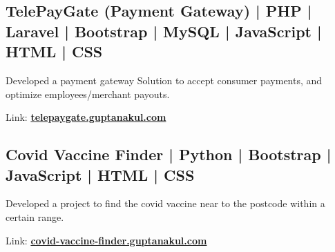 \documentclass[]{deedy-resume-openfont}
\begin{document}
\begin{minipage}[t]{0.55\textwidth}
\subsection{TelePayGate (Payment Gateway) | PHP | Laravel | Bootstrap | MySQL | JavaScript | HTML | CSS}
\sectionsep
\vspace{\topsep}
\begin{tightemize}
\item Developed a payment gateway Solution to accept consumer payments, and optimize employees/merchant payouts.
\item Link: \href{https://telepaygate.guptanakul.com}{\bf telepaygate.guptanakul.com}
\end{tightemize}
\sectionsep
\sectionsep
\subsection{Covid Vaccine Finder | Python | Bootstrap | JavaScript | HTML | CSS}
\sectionsep
\vspace{\topsep}
\begin{tightemize}
\item Developed a project to find the covid vaccine near to the postcode within a certain range.
\item Link: \href{https://covid-vaccine-finder.guptanakul.com}{\bf covid-vaccine-finder.guptanakul.com}
\end{tightemize}
\sectionsep

\end{minipage} 
\sectionsep
\end{document}
